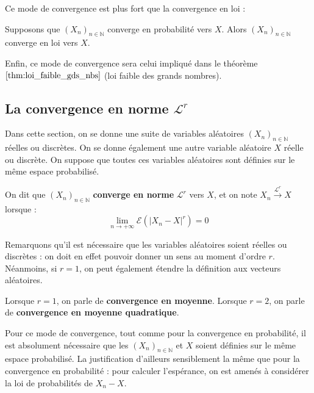 \documentclass[../integ-proba.tex]{subfiles}
\begin{document}
Ce mode de convergence est plus fort que la convergence en loi :

\begin{prop}
    Supposons que $\left(X_n\right)_{n\in\mathbb{N}}$ converge en probabilité vers $X$.
    Alors $\left(X_n\right)_{n\in\mathbb{N}}$ converge en loi vers $X$.
\end{prop}

\begin{rem}
    Enfin, ce mode de convergence sera celui impliqué dans le théorème $\ref{thm:loi_faible_gds_nbs}$ (loi faible des grands nombres).
\end{rem}

\subsection{La convergence en norme $\mathcal{L}^r$}

Dans cette section, on se donne une suite de variables aléatoires $\left(X_n\right)_{n\in\mathbb{N}}$ réelles ou discrètes.
On se donne également une autre variable aléatoire $X$ réelle ou discrète.
On suppose que toutes ces variables aléatoires sont définies sur le même espace probabilisé.

\begin{defi}
    On dit que $\left(X_n\right)_{n\in\mathbb{N}}$ \textbf{converge en norme} $\mathcal{L}^r$ vers $X$, et on note $X_n \xrightarrow[]{\mathcal{L}^r} X$ lorsque :
    $$
    \lim_{n \to +\infty}\mathcal{E}\left(\left|X_n - X\right|^r\right) = 0
    $$
\end{defi}

\begin{rem}
    Remarquons qu'il est nécessaire que les variables aléatoires soient réelles ou discrètes : on doit en effet pouvoir donner un sens au moment d'ordre $r$.
    Néanmoins, si $r=1$, on peut également étendre la définition aux vecteurs aléatoires.
\end{rem}

\begin{rem}
    Lorsque $r=1$, on parle de \textbf{convergence en moyenne}.
    Lorsque $r=2$, on parle de \textbf{convergence en moyenne quadratique}.
\end{rem}

\begin{rem}
    Pour ce mode de convergence, tout comme pour la convergence en probabilité, il est absolument nécessaire que les $\left(X_n\right)_{n\in\mathbb{N}}$ et $X$ soient définies sur le même espace probabilisé.
    La justification d'ailleurs sensiblement la même que pour la convergence en probabilité : pour calculer l'espérance, on est amenés à considérer la loi de probabilités de $X_n - X$.
\end{rem}
\end{document}
